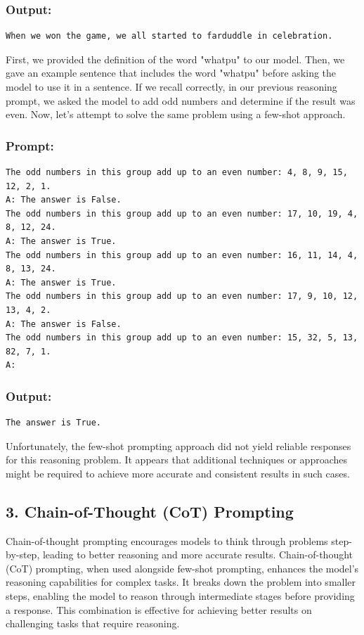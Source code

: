 \documentclass[10pt]{article}
\begin{document}
\subsubsection*{Output:}
\begin{verbatim}
When we won the game, we all started to farduddle in celebration.
\end{verbatim}

First, we provided the definition of the word "whatpu" to our model. Then, we gave an example sentence that includes the word "whatpu" before asking the model to use it in a sentence. If we recall correctly, in our previous reasoning prompt, we asked the model to add odd numbers and determine if the result was even. Now, let's attempt to solve the same problem using a few-shot approach.

\subsubsection*{Prompt:}
\begin{verbatim}
The odd numbers in this group add up to an even number: 4, 8, 9, 15, 12, 2, 1.
A: The answer is False.
The odd numbers in this group add up to an even number: 17, 10, 19, 4, 8, 12, 24.
A: The answer is True.
The odd numbers in this group add up to an even number: 16, 11, 14, 4, 8, 13, 24.
A: The answer is True.
The odd numbers in this group add up to an even number: 17, 9, 10, 12, 13, 4, 2.
A: The answer is False.
The odd numbers in this group add up to an even number: 15, 32, 5, 13, 82, 7, 1.
A:
\end{verbatim}

\subsubsection*{Output:}
\begin{verbatim}
The answer is True.
\end{verbatim}

Unfortunately, the few-shot prompting approach did not yield reliable responses for this reasoning problem. It appears that additional techniques or approaches might be required to achieve more accurate and consistent results in such cases.

\subsection*{3. Chain-of-Thought (CoT) Prompting}
Chain-of-thought prompting encourages models to think through problems step-by-step, leading to better reasoning and more accurate results. Chain-of-thought (CoT) prompting, when used alongside few-shot prompting, enhances the model's reasoning capabilities for complex tasks. It breaks down the problem into smaller steps, enabling the model to reason through intermediate stages before providing a response. This combination is effective for achieving better results on challenging tasks that require reasoning.
\end{document}
